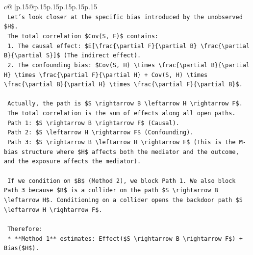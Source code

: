 \documentclass{article}
\begin{document}
{\begin{supertabular}{c@{$\;$}|p{.15\linewidth}@{}p{.15\linewidth}p{.15\linewidth}p{.15\linewidth}p{.15\linewidth}p{.15\linewidth}}
{{{\\ 
\texttt{    Let's look closer at the specific bias introduced by the unobserved \$H\$.} \\
\texttt{    The total correlation \$Cov(S, F)\$ contains:} \\
\texttt{    1.  The causal effect: \$E{[}\textbackslash{}frac\{\textbackslash{}partial F\}\{\textbackslash{}partial B\} \textbackslash{}frac\{\textbackslash{}partial B\}\{\textbackslash{}partial S\}{]}\$ (The indirect effect).} \\
\texttt{    2.  The confounding bias: \$Cov(S, H) \textbackslash{}times \textbackslash{}frac\{\textbackslash{}partial B\}\{\textbackslash{}partial H\} \textbackslash{}times \textbackslash{}frac\{\textbackslash{}partial F\}\{\textbackslash{}partial H\} + Cov(S, H) \textbackslash{}times \textbackslash{}frac\{\textbackslash{}partial B\}\{\textbackslash{}partial H\} \textbackslash{}times \textbackslash{}frac\{\textbackslash{}partial F\}\{\textbackslash{}partial B\}\$.} \\
\\ 
\texttt{    Actually, the path is \$S \textbackslash{}rightarrow B \textbackslash{}leftarrow H \textbackslash{}rightarrow F\$.} \\
\texttt{    The total correlation is the sum of effects along all open paths.} \\
\texttt{    Path 1: \$S \textbackslash{}rightarrow B \textbackslash{}rightarrow F\$ (Causal).} \\
\texttt{    Path 2: \$S \textbackslash{}leftarrow H \textbackslash{}rightarrow F\$ (Confounding).} \\
\texttt{    Path 3: \$S \textbackslash{}rightarrow B \textbackslash{}leftarrow H \textbackslash{}rightarrow F\$ (This is the M{-}bias structure where \$H\$ affects both the mediator and the outcome, and the exposure affects the mediator).} \\
\\ 
\texttt{    If we condition on \$B\$ (Method 2), we block Path 1. We also block Path 3 because \$B\$ is a collider on the path \$S \textbackslash{}rightarrow B \textbackslash{}leftarrow H\$. Conditioning on a collider opens the backdoor path \$S \textbackslash{}leftarrow H \textbackslash{}rightarrow F\$.} \\
\\ 
\texttt{    Therefore:} \\
\texttt{    *   **Method 1** estimates: Effect(\$S \textbackslash{}rightarrow B \textbackslash{}rightarrow F\$) + Bias(\$H\$).} \\
}}}
\end{supertabular}}
\end{document}
